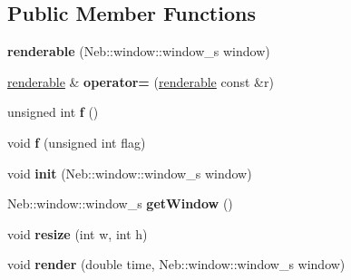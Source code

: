 \subsection*{\-Public \-Member \-Functions}
\begin{DoxyCompactItemize}
\item 
\hypertarget{classNeb_1_1renderable_af3b47768c919df0faf660899c33dd6e8}{{\bfseries renderable} (\-Neb\-::window\-::window\-\_\-s window)}\label{classNeb_1_1renderable_af3b47768c919df0faf660899c33dd6e8}

\item 
\hypertarget{classNeb_1_1renderable_a7c18c1b5d009a3fb73f86e335ffcc556}{\hyperlink{classNeb_1_1renderable}{renderable} \& {\bfseries operator=} (\hyperlink{classNeb_1_1renderable}{renderable} const \&r)}\label{classNeb_1_1renderable_a7c18c1b5d009a3fb73f86e335ffcc556}

\item 
\hypertarget{classNeb_1_1renderable_aac705af4136c474069d851a9520f5720}{unsigned int {\bfseries f} ()}\label{classNeb_1_1renderable_aac705af4136c474069d851a9520f5720}

\item 
\hypertarget{classNeb_1_1renderable_a971cd016cc408f732f5d0460744e2a48}{void {\bfseries f} (unsigned int flag)}\label{classNeb_1_1renderable_a971cd016cc408f732f5d0460744e2a48}

\item 
\hypertarget{classNeb_1_1renderable_a7ff2af24b83fef9b240858976257ab3d}{void {\bfseries init} (\-Neb\-::window\-::window\-\_\-s window)}\label{classNeb_1_1renderable_a7ff2af24b83fef9b240858976257ab3d}

\item 
\hypertarget{classNeb_1_1renderable_a33656881f53f9be7bab71ea5cc316ef1}{\-Neb\-::window\-::window\-\_\-s {\bfseries get\-Window} ()}\label{classNeb_1_1renderable_a33656881f53f9be7bab71ea5cc316ef1}

\item 
\hypertarget{classNeb_1_1renderable_abd73b2bba233d1ff95fe46496888a5cf}{void {\bfseries resize} (int w, int h)}\label{classNeb_1_1renderable_abd73b2bba233d1ff95fe46496888a5cf}

\item 
\hypertarget{classNeb_1_1renderable_ab9c70cca0380015ecfde70d9a106c31c}{void {\bfseries render} (double time, \-Neb\-::window\-::window\-\_\-s window)}\label{classNeb_1_1renderable_ab9c70cca0380015ecfde70d9a106c31c}

\end{DoxyCompactItemize}
